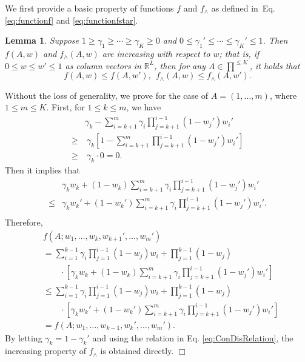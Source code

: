 \documentclass{article}
\newcommand{\RR}{\mathbb{R}}
\newtheorem{lemma}[theorem]{Lemma}%
\newenvironment{proof}{\noindent {\textbf{Proof. }}}{$\Box$ \medskip}
\begin{document}
We first provide a basic property of functions $f$ and $f_{\wedge}$ as defined
in~Eq.\eqref{eq:functionf} and \eqref{eq:functionfstar}.
\begin{lemma}
\label{lem:increasing} 
Suppose $1 \geq \gamma_1 \geq \cdots \geq \gamma_K \geq 0$ and $0 \leq \gamma_1' \leq \cdots \leq \gamma_K' \leq 1$. Then $f(A, w)$ and $f_{\wedge}(A, w)$ are increasing with respect to $w$; that is, if $0 \leq w \leq w' \leq 1$ as column vectors in $\RR^L$, then for any $A \in \prod^{\leq K}$, it holds that
$$
f(A, w) \leq f(A, w'), ~~ f_{\wedge}(A, w) \leq f_{\wedge}(A, w').
$$
\end{lemma}
\begin{proof}
Without the loss of generality, we prove for the case
	of $A = (1, \ldots, m)$, where $1 \leq m \leq K$. 
First, for $1 \leq k \leq m$, we have
\begin{align*}
&\gamma_{k} - \sum_{i=k+1}^m \gamma_i \prod_{j = k + 1}^{i - 1} (1 - w_j') w_i'\\
\geq &~\gamma_k [1 - \sum_{i=k+1}^m \prod_{j=k+1}^{i-1}(1 - w_j') w_i']\\
\geq &~\gamma_{k} \cdot 0 = 0.
\end{align*}
Then it implies that
\begin{align*}
&\gamma_k w_k + (1 - w_k)\sum_{i=k+1}^m \gamma_i \prod_{j=k+1}^{i-1}(1 - w_j') w_i'\\
\leq &\gamma_k w_k' + (1 - w_k')\sum_{i=k+1}^m \gamma_i \prod_{j=k+1}^{i-1}(1 - w_j') w_i'.\\
\end{align*}
Therefore, 
\begin{align*}
& f(A; w_1, \dots, w_k, w_{k+1}', \dots, w_m')\\
&=\sum_{i=1}^{k-1} \gamma_i \prod_{j=1}^{i-1}(1 - w_j) w_i + \prod_{j=1}^{k-1}(1 - w_j) \\
&\qquad \cdot [\gamma_k w_k + (1 - w_k)\sum_{i=k+1}^m \gamma_i \prod_{j=k+1}^{i-1}(1 - w_j') w_i']\\
&\leq \sum_{i=1}^{k-1} \gamma_i \prod_{j=1}^{i-1}(1 - w_j) w_i + \prod_{j=1}^{k-1}(1 - w_j) \\
&\qquad \cdot [\gamma_k w_k' + (1 - w_k')\sum_{i=k+1}^m \gamma_i \prod_{j=k+1}^{i-1}(1 - w_j') w_i']\\
&=f(A; w_1, \ldots, w_{k-1}, w_{k}', \ldots, w_m').
\end{align*}
By letting $\gamma_k = 1 - \gamma_k'$ and using the relation
	in Eq. \eqref{eq:ConDisRelation}, the increasing property of $f_{\wedge}$ is obtained directly.
\end{proof}
\end{document}
